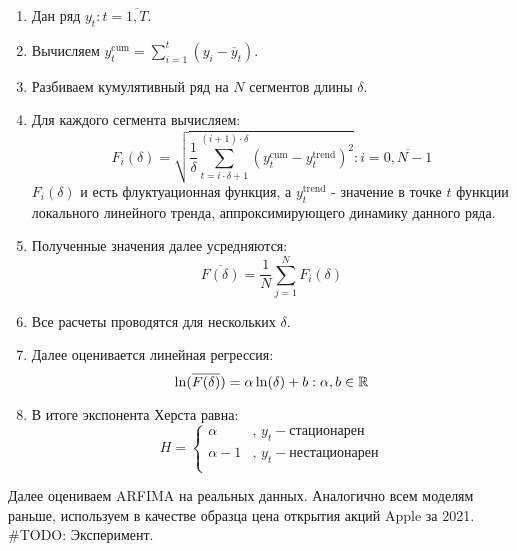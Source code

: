\begin{enumerate}
	\item Дан ряд $y_t: t = \overline{1, T}$.
	\item Вычисляем $y^{\text{cum}}_t = \sum_{i = 1}^t (y_i - \overline{y}_t)$.
	\item Разбиваем кумулятивный ряд на $N$ сегментов длины $\delta$.
	\item Для каждого сегмента вычисляем:
	\begin{equation}
		F_i(\delta) = \sqrt{\frac{1}{\delta} \sum_{t = i \cdot \delta + 1}^{(i + 1) \cdot \delta} \left(y_t^{\text{cum}} - y^{\text{trend}}_t \right)^2}: i = \overline{0, N - 1}
	\end{equation}
	$F_i(\delta)$ и есть флуктуационная функция, а $y^{\text{trend}}_t$ - значение в точке $t$ функции локального линейного тренда, аппроксимирующего динамику данного ряда.
	\item Полученные значения далее усредняются:
	\begin{equation}
		\overline{F(\delta)} = \frac{1}{N}\sum_{j = 1}^N F_i(\delta)
	\end{equation}
	\item Все расчеты проводятся для нескольких $\delta$.
	\item Далее оценивается линейная регрессия:
	\begin{equation}
		\ln(\overline{F(\delta)}) = \alpha \ln(\delta) + b: \alpha, b \in \mathbb{R}
	\end{equation}
	\item В итоге экспонента Херста равна:
	\begin{equation}
		H = \left\{\begin{array}{rl}
			\alpha & \text{, } y_t - \text{стационарен}\\
			\alpha - 1 & \text{, } y_t - \text{нестационарен}\\
		\end{array}\right.
	\end{equation}
\end{enumerate}

\noindent Далее оцениваем ARFIMA на реальных данных. Аналогично всем моделям раньше, используем в качестве образца цена открытия акций Apple за 2021.\\

\#TODO: Эксперимент.